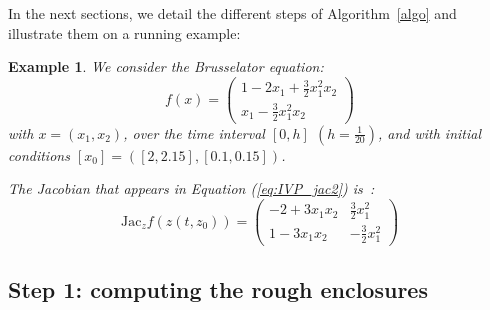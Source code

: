 \documentclass{sig-alternate-05-2015}
\newcommand\ForAuthors[1]%
 {\par\smallskip                     %
  \begin{center}%
   \fbox%
   {\parbox{0.9\linewidth}%
    {\raggedright\sc--- #1}%
   }%
  \end{center}%
  \par\smallskip                     %
 }
\newtheorem{example}{Example}
\def\intvl#1{\mbox{$[ #1 ]$}}
\begin{document}
In the next sections, we detail the different steps of Algorithm~\ref{algo} and illustrate them on a running example:
\begin{example}
\label{running0}
\label{running1}
We consider the Brusselator equation: 
$$ f(x) = \left(\begin{array}{l}
1-2 x_1+\frac{3}{2} x_1^2 x_2 \\
x_1-\frac{3}{2} x_1^2x_2
\end{array}\right)$$
\noindent with $x=(x_1,x_2)$, over the time interval $\left[0,h\right]$ 
$\left(h=\frac{1}{20}\right)$, and with initial conditions
$\intvl{x_0}=\left([2, 2.15],[0.1, 0.15]\right)$.

The Jacobian that appears in Equation (\ref{eq:IVP_jac2}) is~: 
$$
\mbox{Jac}_z f(z(t,z_0)) = \left(\begin{array}{cc} 
-2+3x_1x_2  & \frac{3}{2} x^2_1 \\
1-3x_1x_2 & -\frac{3}{2} x^2_1
\end{array}\right)
$$
\end{example}

\subsection{Step 1: computing the rough enclosures}
\label{roughenc}
\end{document}
